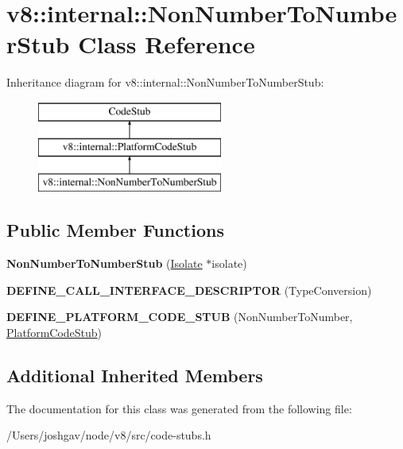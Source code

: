 \hypertarget{classv8_1_1internal_1_1_non_number_to_number_stub}{}\section{v8\+:\+:internal\+:\+:Non\+Number\+To\+Number\+Stub Class Reference}
\label{classv8_1_1internal_1_1_non_number_to_number_stub}
Inheritance diagram for v8\+:\+:internal\+:\+:Non\+Number\+To\+Number\+Stub\+:\begin{figure}[H]
\begin{center}
\leavevmode
\includegraphics[height=3.000000cm]{classv8_1_1internal_1_1_non_number_to_number_stub}
\end{center}
\end{figure}
\subsection*{Public Member Functions}
\begin{DoxyCompactItemize}
\item 
{\bfseries Non\+Number\+To\+Number\+Stub} (\hyperlink{classv8_1_1internal_1_1_isolate}{Isolate} $\ast$isolate)\hypertarget{classv8_1_1internal_1_1_non_number_to_number_stub_aa85ce6ab0ebfd54798b49367d9b5a53e}{}\label{classv8_1_1internal_1_1_non_number_to_number_stub_aa85ce6ab0ebfd54798b49367d9b5a53e}

\item 
{\bfseries D\+E\+F\+I\+N\+E\+\_\+\+C\+A\+L\+L\+\_\+\+I\+N\+T\+E\+R\+F\+A\+C\+E\+\_\+\+D\+E\+S\+C\+R\+I\+P\+T\+OR} (Type\+Conversion)\hypertarget{classv8_1_1internal_1_1_non_number_to_number_stub_aff417aa691d2899a783e7443bccb8c7b}{}\label{classv8_1_1internal_1_1_non_number_to_number_stub_aff417aa691d2899a783e7443bccb8c7b}

\item 
{\bfseries D\+E\+F\+I\+N\+E\+\_\+\+P\+L\+A\+T\+F\+O\+R\+M\+\_\+\+C\+O\+D\+E\+\_\+\+S\+T\+UB} (Non\+Number\+To\+Number, \hyperlink{classv8_1_1internal_1_1_platform_code_stub}{Platform\+Code\+Stub})\hypertarget{classv8_1_1internal_1_1_non_number_to_number_stub_a51731c5019067fc726bbbf2efb42a9ea}{}\label{classv8_1_1internal_1_1_non_number_to_number_stub_a51731c5019067fc726bbbf2efb42a9ea}

\end{DoxyCompactItemize}
\subsection*{Additional Inherited Members}


The documentation for this class was generated from the following file\+:\begin{DoxyCompactItemize}
\item 
/\+Users/joshgav/node/v8/src/code-\/stubs.\+h\end{DoxyCompactItemize}
